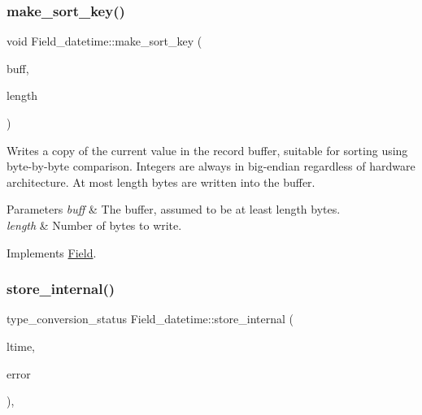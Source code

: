\mbox{\label{classField__datetime_a442d561ebb53b6825e336bc69f2a3c3a}} 
\subsubsection{\texorpdfstring{make\+\_\+sort\+\_\+key()}{make\_sort\_key()}}
{\footnotesize\ttfamily void Field\+\_\+datetime\+::make\+\_\+sort\+\_\+key (\begin{DoxyParamCaption}\item[{uchar $\ast$}]{buff,  }\item[{size\+\_\+t}]{length }\end{DoxyParamCaption})\hspace{0.3cm}{\ttfamily [virtual]}}

Writes a copy of the current value in the record buffer, suitable for sorting using byte-\/by-\/byte comparison. Integers are always in big-\/endian regardless of hardware architecture. At most length bytes are written into the buffer.


\begin{DoxyParams}{Parameters}
{\em buff} & The buffer, assumed to be at least length bytes.\\
\hline
{\em length} & Number of bytes to write. \\
\hline
\end{DoxyParams}


Implements \mbox{\hyperlink{classField_af3bc27d237b6ae6ef3dc7a2aec3d79ac}{Field}}.

\mbox{\label{classField__datetime_a727cd235b40a644b6110ee16b8cef7df}} 
\subsubsection{\texorpdfstring{store\+\_\+internal()}{store\_internal()}}
{\footnotesize\ttfamily type\+\_\+conversion\+\_\+status Field\+\_\+datetime\+::store\+\_\+internal (\begin{DoxyParamCaption}\item[{const M\+Y\+S\+Q\+L\+\_\+\+T\+I\+ME $\ast$}]{ltime,  }\item[{int $\ast$}]{error }\end{DoxyParamCaption})\hspace{0.3cm}{\ttfamily [protected]}, {\ttfamily [virtual]}}

